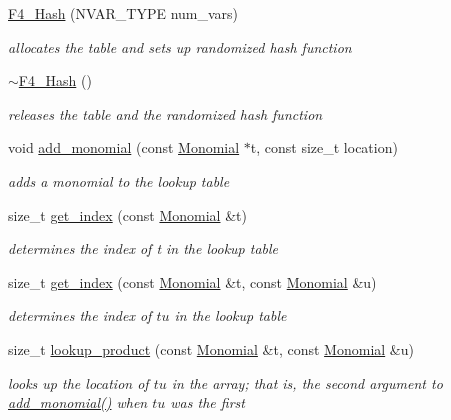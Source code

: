 \begin{DoxyCompactItemize}
\item 
\hyperlink{group___g_b_computation_a3983b59e08fa7ad90bba989850f9850f}{F4\+\_\+\+Hash} (N\+V\+A\+R\+\_\+\+T\+Y\+PE num\+\_\+vars)
\begin{DoxyCompactList}\small\item\em allocates the table and sets up randomized hash function \end{DoxyCompactList}\item 
\mbox{\label{group___g_b_computation_a25d18c80d34ca2b2113d0a49c92748a7}} 
\hyperlink{group___g_b_computation_a25d18c80d34ca2b2113d0a49c92748a7}{$\sim$\+F4\+\_\+\+Hash} ()
\begin{DoxyCompactList}\small\item\em releases the table and the randomized hash function \end{DoxyCompactList}\item 
void \hyperlink{group___g_b_computation_a86a18244162325e3d792ea39525b23f8}{add\+\_\+monomial} (const \hyperlink{group__polygroup_class_monomial}{Monomial} $\ast$t, const size\+\_\+t location)
\begin{DoxyCompactList}\small\item\em adds a monomial to the lookup table \end{DoxyCompactList}\item 
size\+\_\+t \hyperlink{group___g_b_computation_a7b22f6999f276e58087fe668a01f240a}{get\+\_\+index} (const \hyperlink{group__polygroup_class_monomial}{Monomial} \&t)
\begin{DoxyCompactList}\small\item\em determines the index of {\ttfamily t} in the lookup table \end{DoxyCompactList}\item 
size\+\_\+t \hyperlink{group___g_b_computation_a12cff698cefa0375ab76ee6c36a0ce6c}{get\+\_\+index} (const \hyperlink{group__polygroup_class_monomial}{Monomial} \&t, const \hyperlink{group__polygroup_class_monomial}{Monomial} \&u)
\begin{DoxyCompactList}\small\item\em determines the index of $tu$ in the lookup table \end{DoxyCompactList}\item 
size\+\_\+t \hyperlink{group___g_b_computation_a539f858e09579b9119941795e42cdc4f}{lookup\+\_\+product} (const \hyperlink{group__polygroup_class_monomial}{Monomial} \&t, const \hyperlink{group__polygroup_class_monomial}{Monomial} \&u)
\begin{DoxyCompactList}\small\item\em looks up the location of $tu$ in the array; that is, the second argument to {\ttfamily \hyperlink{group___g_b_computation_a86a18244162325e3d792ea39525b23f8}{add\+\_\+monomial()}} when $tu$ was the first \end{DoxyCompactList}\end{DoxyCompactItemize}
